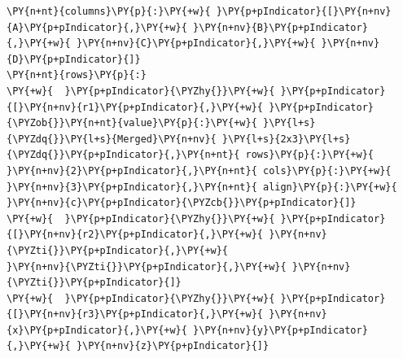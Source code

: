 \documentclass[a4paper,twoside]{article}
\begin{document}
\begin{tscode}[lang=yaml, engine=pygments]
\begin{Verbatim}[commandchars=\\\{\},breaklines, breakanywhere, commandchars=\\\{\}]
\PY{n+nt}{columns}\PY{p}{:}\PY{+w}{ }\PY{p+pIndicator}{[}\PY{n+nv}{A}\PY{p+pIndicator}{,}\PY{+w}{ }\PY{n+nv}{B}\PY{p+pIndicator}{,}\PY{+w}{ }\PY{n+nv}{C}\PY{p+pIndicator}{,}\PY{+w}{ }\PY{n+nv}{D}\PY{p+pIndicator}{]}
\PY{n+nt}{rows}\PY{p}{:}
\PY{+w}{  }\PY{p+pIndicator}{\PYZhy{}}\PY{+w}{ }\PY{p+pIndicator}{[}\PY{n+nv}{r1}\PY{p+pIndicator}{,}\PY{+w}{ }\PY{p+pIndicator}{\PYZob{}}\PY{n+nt}{value}\PY{p}{:}\PY{+w}{ }\PY{l+s}{\PYZdq{}}\PY{l+s}{Merged}\PY{n+nv}{ }\PY{l+s}{2x3}\PY{l+s}{\PYZdq{}}\PY{p+pIndicator}{,}\PY{n+nt}{ rows}\PY{p}{:}\PY{+w}{ }\PY{n+nv}{2}\PY{p+pIndicator}{,}\PY{n+nt}{ cols}\PY{p}{:}\PY{+w}{ }\PY{n+nv}{3}\PY{p+pIndicator}{,}\PY{n+nt}{ align}\PY{p}{:}\PY{+w}{ }\PY{n+nv}{c}\PY{p+pIndicator}{\PYZcb{}}\PY{p+pIndicator}{]}
\PY{+w}{  }\PY{p+pIndicator}{\PYZhy{}}\PY{+w}{ }\PY{p+pIndicator}{[}\PY{n+nv}{r2}\PY{p+pIndicator}{,}\PY{+w}{ }\PY{n+nv}{\PYZti{}}\PY{p+pIndicator}{,}\PY{+w}{                                                 }\PY{n+nv}{\PYZti{}}\PY{p+pIndicator}{,}\PY{+w}{ }\PY{n+nv}{\PYZti{}}\PY{p+pIndicator}{]}
\PY{+w}{  }\PY{p+pIndicator}{\PYZhy{}}\PY{+w}{ }\PY{p+pIndicator}{[}\PY{n+nv}{r3}\PY{p+pIndicator}{,}\PY{+w}{ }\PY{n+nv}{x}\PY{p+pIndicator}{,}\PY{+w}{ }\PY{n+nv}{y}\PY{p+pIndicator}{,}\PY{+w}{ }\PY{n+nv}{z}\PY{p+pIndicator}{]}
\end{Verbatim}
\end{tscode}
\end{document}
